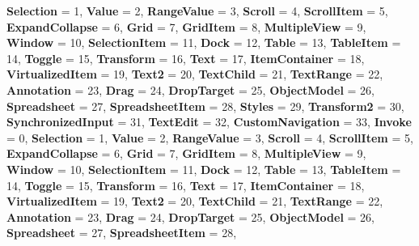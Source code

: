 \begin{DoxyCompactItemize}
{\bfseries Selection} = 1, 
\newline
{\bfseries Value} = 2, 
{\bfseries Range\+Value} = 3, 
{\bfseries Scroll} = 4, 
{\bfseries Scroll\+Item} = 5, 
\newline
{\bfseries Expand\+Collapse} = 6, 
{\bfseries Grid} = 7, 
{\bfseries Grid\+Item} = 8, 
{\bfseries Multiple\+View} = 9, 
\newline
{\bfseries Window} = 10, 
{\bfseries Selection\+Item} = 11, 
{\bfseries Dock} = 12, 
{\bfseries Table} = 13, 
\newline
{\bfseries Table\+Item} = 14, 
{\bfseries Toggle} = 15, 
{\bfseries Transform} = 16, 
{\bfseries Text} = 17, 
\newline
{\bfseries Item\+Container} = 18, 
{\bfseries Virtualized\+Item} = 19, 
{\bfseries Text2} = 20, 
{\bfseries Text\+Child} = 21, 
\newline
{\bfseries Text\+Range} = 22, 
{\bfseries Annotation} = 23, 
{\bfseries Drag} = 24, 
{\bfseries Drop\+Target} = 25, 
\newline
{\bfseries Object\+Model} = 26, 
{\bfseries Spreadsheet} = 27, 
{\bfseries Spreadsheet\+Item} = 28, 
{\bfseries Styles} = 29, 
\newline
{\bfseries Transform2} = 30, 
{\bfseries Synchronized\+Input} = 31, 
{\bfseries Text\+Edit} = 32, 
{\bfseries Custom\+Navigation} = 33, 
\newline
{\bfseries Invoke} = 0, 
{\bfseries Selection} = 1, 
{\bfseries Value} = 2, 
{\bfseries Range\+Value} = 3, 
\newline
{\bfseries Scroll} = 4, 
{\bfseries Scroll\+Item} = 5, 
{\bfseries Expand\+Collapse} = 6, 
{\bfseries Grid} = 7, 
\newline
{\bfseries Grid\+Item} = 8, 
{\bfseries Multiple\+View} = 9, 
{\bfseries Window} = 10, 
{\bfseries Selection\+Item} = 11, 
\newline
{\bfseries Dock} = 12, 
{\bfseries Table} = 13, 
{\bfseries Table\+Item} = 14, 
{\bfseries Toggle} = 15, 
\newline
{\bfseries Transform} = 16, 
{\bfseries Text} = 17, 
{\bfseries Item\+Container} = 18, 
{\bfseries Virtualized\+Item} = 19, 
\newline
{\bfseries Text2} = 20, 
{\bfseries Text\+Child} = 21, 
{\bfseries Text\+Range} = 22, 
{\bfseries Annotation} = 23, 
\newline
{\bfseries Drag} = 24, 
{\bfseries Drop\+Target} = 25, 
{\bfseries Object\+Model} = 26, 
{\bfseries Spreadsheet} = 27, 
\newline
{\bfseries Spreadsheet\+Item} = 28, 

\end{DoxyCompactItemize}
